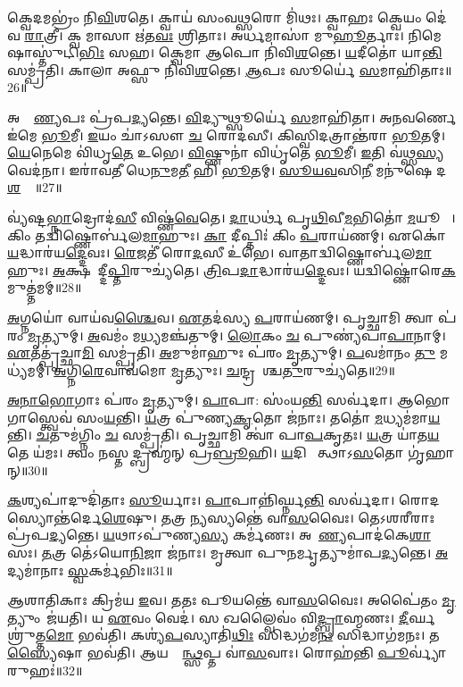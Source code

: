 𑌕𑍍𑌵𑍇𑌦𑌮𑌭𑍍𑌰𑌂॑ 𑌨𑌿\ul{𑌵𑌿}𑌶𑌤𑍇। 𑌕𑍍𑌵𑌾𑌯॑ 𑌸𑌂𑌵\ul{𑌥𑍍𑌸}𑌰𑍋 𑌮𑌿॑𑌥𑌃। 
𑌕𑍍𑌵𑌾𑌹𑌃 𑌕𑍍𑌵𑍇𑌯𑌂 𑌦𑍇॑𑌵 \ul{𑌰𑌾}𑌤𑍍𑌰𑍀। 𑌕𑍍𑌵 𑌮𑌾𑌸𑌾 𑌋॑𑌤\ul{𑌵𑌃} 𑌶𑍍𑌰𑌿𑌤𑌾𑌃। 
𑌅𑌰𑍍𑌧𑌮𑌾𑌸𑌾॑ 𑌮𑍁\ul{𑌹𑍂}𑌰𑍍𑌤𑌾𑌃। 𑌨𑌿𑌮𑍇𑌷𑌾𑌸𑍍𑌤𑍁॑𑌟𑌿\ul{𑌭𑌿𑌃} 𑌸𑌹। 
𑌕𑍍𑌵𑍇𑌮𑌾 𑌆𑌪𑍋 𑌨𑌿॑𑌵𑌿\ul{𑌶}𑌨𑍍𑌤𑍇। \ul{𑌯}𑌦𑍀𑌤𑍋॑ 𑌯𑌾\ul{𑌨𑍍𑌤𑌿} 𑌸𑌮𑍍𑌪𑍍𑌰॑𑌤𑌿। 
𑌕𑌾𑌲𑌾 𑌅𑌫𑍍𑌸𑍁 𑌨𑌿॑𑌵𑌿\ul{𑌶}𑌨𑍍𑌤𑍇। \ul{𑌆}𑌪𑌃 𑌸𑍂𑌰𑍍𑌯𑍇॑ \ul{𑌸}𑌮𑌾𑌹𑌿॑𑌤𑌾𑌃॥26॥

𑌅𑌭𑍍𑌰𑌾᳚\ul{𑌣𑍍𑌯}𑌪𑌃 𑌪𑍍𑌰॑𑌪\ul{𑌦𑍍𑌯}𑌨𑍍𑌤𑍇। \ul{𑌵𑌿}𑌦𑍍𑌯𑍁𑌥𑍍𑌸𑍂𑌰𑍍𑌯𑍇॑ \ul{𑌸}𑌮𑌾𑌹𑌿॑𑌤𑌾। 
𑌅𑌨𑌵𑌰𑍍𑌣𑍇 𑌇॑𑌮𑍇 \ul{𑌭𑍂}𑌮𑍀। \ul{𑌇}𑌯𑌂 𑌚𑌾॑𑌽𑌸𑍗 \ul{𑌚} 𑌰𑍋𑌦॑𑌸𑍀। 
𑌕𑌿𑌸𑍍𑌵𑌿𑌦𑌤𑍍𑌰𑌾𑌨𑍍𑌤॑𑌰𑌾 \ul{𑌭𑍂}𑌤𑌮𑍍। \ul{𑌯𑍇}𑌨𑍇𑌮𑍇 𑌵𑌿॑𑌧𑍃\ul{𑌤𑍇} 𑌉𑌭𑍇। 
\ul{𑌵𑌿}𑌷𑍍𑌣𑍁𑌨𑌾॑ 𑌵𑌿𑌧𑍃॑𑌤𑍇 \ul{𑌭𑍂}𑌮𑍀। \ul{𑌇}𑌤𑌿 𑌵॑𑌥𑍍𑌸\ul{𑌸𑍍𑌯} 𑌵𑍇𑌦॑𑌨𑌾। 
𑌇𑌰𑌾॑𑌵𑌤𑍀 𑌧𑍇\ul{𑌨𑍁}𑌮\ul{𑌤𑍀} 𑌹𑌿 \ul{𑌭𑍂}𑌤𑌮𑍍‌। \ul{𑌸𑍂}\ul{𑌯}\ul{𑌵}𑌸𑌿\ul{𑌨𑍀} 𑌮𑌨𑍁॑𑌷𑍇 𑌦\ul{𑌶}𑌸𑍍𑌯𑍇᳚॥27॥

𑌵𑍍𑌯॑𑌷𑍍𑌟\ul{𑌭𑍍𑌨𑌾}𑌦𑍍𑌰𑍋𑌦॑\ul{𑌸𑍀} 𑌵𑌿𑌷𑍍𑌣॑\ul{𑌵𑍇}𑌤𑍇। \ul{𑌦𑌾}𑌧𑌰𑍍𑌥॑ 𑌪𑍃\ul{𑌥𑌿}𑌵𑍀\ul{𑌮}𑌭𑌿𑌤𑍋॑ \ul{𑌮}𑌯𑍂𑌖𑍈𑌃᳚। 
𑌕𑌿𑌂 𑌤𑌦𑍍𑌵𑌿𑌷𑍍𑌣𑍋𑌰𑍍𑌬॑𑌲\-\ul{𑌮𑌾}𑌹𑍁𑌃। \ul{𑌕𑌾} 𑌦𑍀𑌪𑍍𑌤𑌿𑌃॑ 𑌕𑌿𑌂 \ul{𑌪}𑌰𑌾𑌯॑𑌣𑌮𑍍‌। 
𑌏𑌕𑍋॑ \ul{𑌯}𑌦𑍍𑌧𑌾𑌰॑𑌯\ul{𑌦𑍍𑌦𑍇}𑌵𑌃। \ul{𑌰𑍇}𑌜𑌤𑍀॑ 𑌰𑍋\ul{𑌦}𑌸𑍀 𑌉॑𑌭𑍇। 
𑌵𑌾𑌤𑌾𑌦𑍍𑌵𑌿𑌷𑍍𑌣𑍋𑌰𑍍𑌬॑𑌲\ul{𑌮𑌾}𑌹𑍁𑌃। \ul{𑌅}𑌕𑍍𑌷𑌰𑌾᳚𑌦𑍍𑌦𑍀\ul{𑌪𑍍𑌤𑌿}𑌰𑍁𑌚𑍍𑌯॑𑌤𑍇। 
\ul{𑌤𑍍𑌰𑌿}𑌪\ul{𑌦𑌾}𑌦𑍍𑌧𑌾𑌰॑𑌯\ul{𑌦𑍍𑌦𑍇}𑌵𑌃। 𑌯𑌦𑍍𑌵𑌿𑌷𑍍𑌣𑍋॑𑌰𑍇\ul{𑌕}𑌮𑍁𑌤𑍍𑌤॑𑌮𑌮𑍍‌॥28॥

\ul{𑌅}𑌗𑍍𑌨𑌯𑍋॑ 𑌵𑌾𑌯॑𑌵\ul{𑌶𑍍𑌚𑍈}𑌵। \ul{𑌏}𑌤𑌦॑𑌸𑍍𑌯 \ul{𑌪}𑌰𑌾𑌯॑𑌣𑌮𑍍‌। 
𑌪𑍃𑌚𑍍𑌛𑌾𑌮𑌿 𑌤𑍍𑌵𑌾 𑌪॑𑌰𑌂 \ul{𑌮𑍃}𑌤𑍍𑌯𑍁𑌮𑍍‌। \ul{𑌅}𑌵𑌮𑌂॑ 𑌮\ul{𑌧𑍍𑌯}𑌮𑌞𑍍𑌚॑𑌤𑍁𑌮𑍍‌। 
\ul{𑌲𑍋}𑌕𑌂 \ul{𑌚} 𑌪𑍁𑌣𑍍𑌯॑𑌪𑌾\ul{𑌪𑌾}𑌨𑌾𑌮𑍍‌। \ul{𑌏}𑌤𑌤𑍍𑌪𑍃॑𑌚𑍍𑌛𑌾\ul{𑌮𑌿} 𑌸𑌮𑍍𑌪𑍍𑌰॑𑌤𑌿। 
\ul{𑌅}𑌮𑍁𑌮𑌾॑𑌹𑍁𑌃 𑌪॑𑌰𑌂 \ul{𑌮𑍃}𑌤𑍍𑌯𑍁𑌮𑍍‌। \ul{𑌪}𑌵𑌮𑌾॑𑌨𑌂 \ul{𑌤𑍁} 𑌮𑌧𑍍𑌯॑𑌮𑌮𑍍‌। 
\ul{𑌅}𑌗𑍍𑌨𑌿\ul{𑌰𑍇}𑌵𑌾𑌵॑𑌮𑍋 \ul{𑌮𑍃}𑌤𑍍𑌯𑍁𑌃। \ul{𑌚}𑌨𑍍𑌦𑍍𑌰𑌮𑌾᳚𑌶𑍍𑌚\ul{𑌤𑍁}𑌰𑍁𑌚𑍍𑌯॑𑌤𑍇॥29॥

\ul{𑌅}\ul{𑌨𑌾}\ul{𑌭𑍋}𑌗𑌾𑌃 𑌪॑𑌰𑌂 \ul{𑌮𑍃}𑌤𑍍𑌯𑍁𑌮𑍍‌। \ul{𑌪𑌾}𑌪𑌾: 𑌸𑌂॑𑌯\ul{𑌨𑍍𑌤𑌿} 𑌸𑌰𑍍𑌵॑𑌦𑌾। 
𑌆𑌭𑍋𑌗𑌾𑌸𑍍𑌤𑍍𑌵𑍇𑌵॑ 𑌸𑌂\ul{𑌯}𑌨𑍍𑌤𑌿। \ul{𑌯}𑌤𑍍𑌰 𑌪𑍁॑𑌣𑍍𑌯\ul{𑌕𑍃}𑌤𑍋 𑌜॑𑌨𑌾𑌃। 
𑌤𑌤𑍋॑ \ul{𑌮}𑌧𑍍𑌯𑌮॑𑌮𑌾\ul{𑌯}𑌨𑍍𑌤𑌿। \ul{𑌚}𑌤𑍁𑌮॑𑌗𑍍𑌨𑌿𑌂 \ul{𑌚} 𑌸𑌮𑍍𑌪𑍍𑌰॑𑌤𑌿। 
𑌪𑍃𑌚𑍍𑌛𑌾𑌮𑌿 𑌤𑍍𑌵𑌾॑ 𑌪𑌾\ul{𑌪}𑌕𑍃𑌤𑌃। \ul{𑌯}𑌤𑍍𑌰 𑌯𑌾॑𑌤\ul{𑌯}𑌤𑍇 𑌯॑𑌮𑌃। 
𑌤𑍍𑌵𑌂 𑌨𑌸𑍍𑌤𑌦𑍍𑌬𑍍𑌰𑌹𑍍𑌮॑𑌨𑍍‌ 𑌪𑍍𑌰\ul{𑌬𑍍𑌰𑍂}𑌹𑌿। \ul{𑌯}𑌦𑌿 𑌵𑍇᳚𑌤𑍍𑌥𑌾𑌽\ul{𑌸}𑌤𑍋 𑌗𑍃॑𑌹𑌾𑌨𑍍‌॥30॥

\ul{𑌕}𑌶𑍍𑌯𑌪𑌾॑𑌦𑍁𑌦𑌿॑𑌤𑌾𑌃 \ul{𑌸𑍂}𑌰𑍍𑌯𑌾𑌃। \ul{𑌪𑌾}𑌪𑌾𑌨𑍍𑌨𑌿॑𑌰𑍍𑌘𑍍𑌨\ul{𑌨𑍍𑌤𑌿} 𑌸𑌰𑍍𑌵॑𑌦𑌾। 
𑌰𑍋𑌦𑌸𑍍𑌯𑍋𑌨𑍍𑌤॑𑌰𑍍𑌦𑍇\-\ul{𑌶𑍇}𑌷𑍁। 𑌤𑌤𑍍𑌰 𑌨𑍍𑌯𑌸𑍍𑌯𑌨𑍍𑌤𑍇॑ 𑌵𑌾\ul{𑌸}𑌵𑍈𑌃। 
𑌤𑍇𑌽𑌶𑌰𑍀𑌰𑌾𑌃 𑌪𑍍𑌰॑𑌪\ul{𑌦𑍍𑌯}𑌨𑍍𑌤𑍇। \ul{𑌯}𑌥𑌾\-𑌽𑌪𑍁॑𑌣𑍍𑌯\ul{𑌸𑍍𑌯} 𑌕𑌰𑍍𑌮॑𑌣𑌃। 
𑌅𑌪𑌾᳚\ul{𑌣𑍍𑌯}𑌪𑌾𑌦॑𑌕𑍇\ul{𑌶𑌾}𑌸𑌃। \ul{𑌤}𑌤𑍍𑌰 𑌤𑍇॑𑌽𑌯𑍋\ul{𑌨𑌿}𑌜𑌾 𑌜॑𑌨𑌾𑌃। 
𑌮𑍃𑌤𑍍𑌵𑌾 𑌪𑍁𑌨𑌰𑍍𑌮𑍃𑌤𑍍𑌯𑍁𑌮𑌾॑𑌪\ul{𑌦𑍍𑌯}𑌨𑍍𑌤𑍇। \ul{𑌅}𑌦𑍍𑌯𑌮𑌾॑𑌨𑌾𑌃 \ul{𑌸𑍍𑌵}𑌕𑌰𑍍𑌮॑𑌭𑌿𑌃॥31॥

𑌆𑌶𑌾𑌤𑌿𑌕𑌾𑌃 𑌕𑍍𑌰𑌿𑌮॑𑌯 \ul{𑌇}𑌵। 𑌤𑌤𑌃 𑌪𑍂𑌯𑌨𑍍𑌤𑍇॑ 𑌵𑌾\ul{𑌸}𑌵𑍈𑌃। 𑌅𑌪𑍈॑𑌤𑌂 \ul{𑌮𑍃}𑌤𑍍𑌯𑍁𑌂 𑌜॑𑌯𑌤𑌿। 
𑌯 \ul{𑌏}𑌵𑌂 𑌵𑍇𑌦॑। 𑌸 𑌖𑌲𑍍𑌵𑍈𑌵𑌂॑ 𑌵𑌿\ul{𑌦𑍍𑌬𑍍𑌰𑌾}𑌹𑍍𑌮𑌣𑌃। \ul{𑌦𑍀}𑌰𑍍𑌘𑌶𑍍𑌰𑍁॑𑌤𑍍𑌤\ul{𑌮𑍋} 𑌭𑌵॑𑌤𑌿। 
𑌕𑌶𑍍𑌯॑\ul{𑌪}𑌸𑍍𑌯𑌾𑌤𑌿॑\ul{𑌥𑌿𑌃} 𑌸𑌿𑌦𑍍𑌧𑌗॑𑌮\ul{𑌨𑌃} 𑌸𑌿𑌦𑍍𑌧𑌾𑌗॑𑌮𑌨𑌃। 𑌤\ul{𑌸𑍍𑌯𑍈}𑌷𑌾 𑌭𑌵॑𑌤𑌿। 
𑌆𑌯𑌸𑍍𑌮𑌿᳚\ul{𑌨𑍍𑌥𑍍𑌸}𑌪𑍍𑌤 𑌵𑌾॑\ul{𑌸}𑌵𑌾𑌃। 𑌰𑍋𑌹॑𑌨𑍍𑌤𑌿 \ul{𑌪𑍂}𑌰𑍍𑌵𑍍𑌯𑌾॑ 𑌰𑍁𑌹𑌃॑॥32॥

